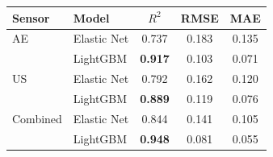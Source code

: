 \begin{tabular}{llccc}
\toprule
Sensor & Model & $R^2$ & RMSE & MAE \\
\midrule
AE & Elastic Net & 0.737 & 0.183 & 0.135 \\
 & LightGBM & \textbf{0.917} & 0.103 & 0.071 \\
\midrule
US & Elastic Net & 0.792 & 0.162 & 0.120 \\
 & LightGBM & \textbf{0.889} & 0.119 & 0.076 \\
\midrule
Combined & Elastic Net & 0.844 & 0.141 & 0.105 \\
 & LightGBM & \textbf{0.948} & 0.081 & 0.055 \\
\bottomrule
\end{tabular}
